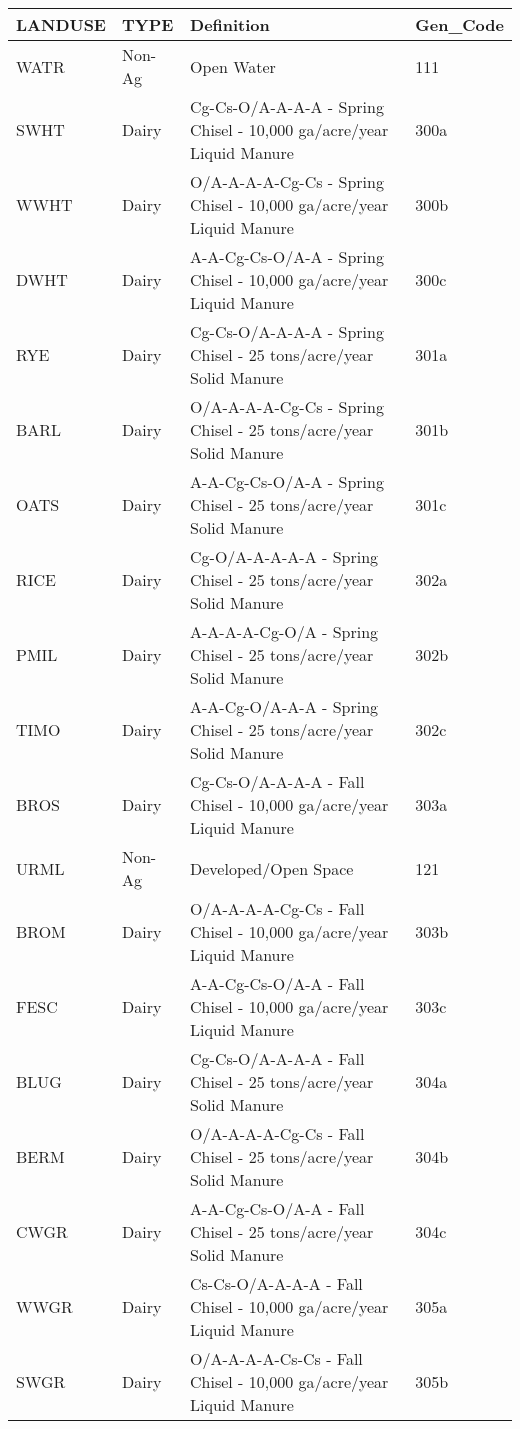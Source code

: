 \begin{longtable}{llll}
  \hline
LANDUSE & TYPE & Definition & Gen\_Code \\ 
  \hline
WATR & Non-Ag & Open Water & 111 \\ 
  SWHT & Dairy & Cg-Cs-O/A-A-A-A - Spring Chisel - 10,000 ga/acre/year Liquid Manure & 300a \\ 
  WWHT & Dairy & O/A-A-A-A-Cg-Cs - Spring Chisel - 10,000 ga/acre/year Liquid Manure & 300b \\ 
  DWHT & Dairy & A-A-Cg-Cs-O/A-A - Spring Chisel - 10,000 ga/acre/year Liquid Manure & 300c \\ 
  RYE & Dairy & Cg-Cs-O/A-A-A-A - Spring Chisel - 25 tons/acre/year Solid Manure & 301a \\ 
  BARL & Dairy & O/A-A-A-A-Cg-Cs - Spring Chisel - 25 tons/acre/year Solid Manure & 301b \\ 
  OATS & Dairy & A-A-Cg-Cs-O/A-A - Spring Chisel - 25 tons/acre/year Solid Manure & 301c \\ 
  RICE & Dairy & Cg-O/A-A-A-A-A - Spring Chisel - 25 tons/acre/year Solid Manure & 302a \\ 
  PMIL & Dairy & A-A-A-A-Cg-O/A - Spring Chisel - 25 tons/acre/year Solid Manure & 302b \\ 
  TIMO & Dairy & A-A-Cg-O/A-A-A - Spring Chisel - 25 tons/acre/year Solid Manure & 302c \\ 
  BROS & Dairy & Cg-Cs-O/A-A-A-A - Fall Chisel - 10,000 ga/acre/year Liquid Manure & 303a \\ 
  URML & Non-Ag & Developed/Open Space & 121 \\ 
  BROM & Dairy & O/A-A-A-A-Cg-Cs - Fall Chisel - 10,000 ga/acre/year Liquid Manure & 303b \\ 
  FESC & Dairy & A-A-Cg-Cs-O/A-A - Fall Chisel - 10,000 ga/acre/year Liquid Manure & 303c \\ 
  BLUG & Dairy & Cg-Cs-O/A-A-A-A - Fall Chisel - 25 tons/acre/year Solid Manure & 304a \\ 
  BERM & Dairy & O/A-A-A-A-Cg-Cs - Fall Chisel - 25 tons/acre/year Solid Manure & 304b \\ 
  CWGR & Dairy & A-A-Cg-Cs-O/A-A - Fall Chisel - 25 tons/acre/year Solid Manure & 304c \\ 
  WWGR & Dairy & Cs-Cs-O/A-A-A-A - Fall Chisel - 10,000 ga/acre/year Liquid Manure & 305a \\ 
  SWGR & Dairy & O/A-A-A-A-Cs-Cs - Fall Chisel - 10,000 ga/acre/year Liquid Manure & 305b \\ 

\end{longtable}
